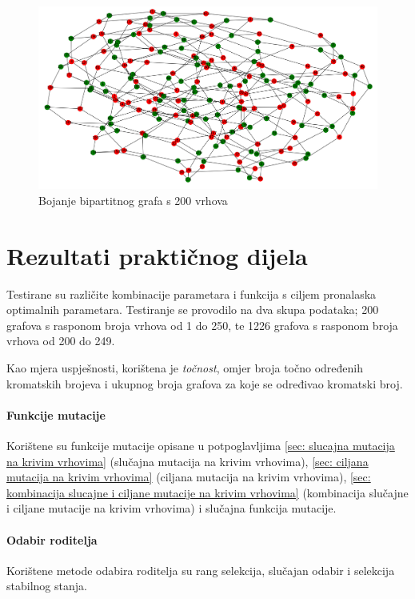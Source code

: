\documentclass[times, utf8, zavrsni]{fer}
\begin{document}
\begin{figure}[htb]
\centering
\includegraphics[width=15cm]{images/200_vrhova_bipartitan_graf.png}
\caption{Bojanje bipartitnog grafa s 200 vrhova}
\label{fig:bojanje grafa s 200 vrhova}
\end{figure}

\chapter{Rezultati praktičnog dijela}
Testirane su različite kombinacije parametara i funkcija s ciljem pronalaska optimalnih parametara. Testiranje se provodilo na dva skupa podataka; 200 grafova s rasponom broja vrhova od 1 do 250, te 1226 grafova s rasponom broja vrhova od 200 do 249.

Kao mjera uspješnosti, korištena je \textit{točnost}, omjer broja točno određenih kromatskih brojeva i ukupnog broja grafova za koje se određivao kromatski broj.

\subsubsection{Funkcije mutacije}
Korištene su funkcije mutacije opisane u potpoglavljima \ref{sec: slucajna mutacija na krivim vrhovima} (slučajna mutacija na krivim vrhovima), \ref{sec: ciljana mutacija na krivim vrhovima} (ciljana mutacija na krivim vrhovima), \ref{sec: kombinacija slucajne i ciljane mutacije na krivim vrhovima} (kombinacija slučajne i ciljane mutacije na krivim vrhovima) i slučajna funkcija mutacije. 

\subsubsection{Odabir roditelja}
Korištene metode odabira roditelja su rang selekcija, slučajan odabir i selekcija stabilnog stanja.
\end{document}
